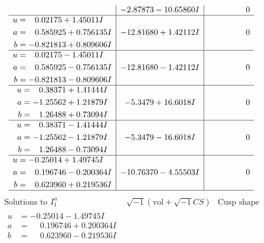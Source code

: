 \documentclass[1p]{elsarticle_modified}
\theoremstyle{definition}
\newcommand{\I}{\sqrt{-1}}
\begin{document}
$$\begin{array}{c|c|c}
 & -2.87873 - 10.65860 I & \phantom{-0.000000 } 0 \\ \hline\begin{aligned}
u &= \phantom{-}0.02175 + 1.45011 I \\
a &= \phantom{-}0.585925 + 0.756135 I \\
b &= -0.821813 + 0.809606 I\end{aligned}
 & -12.81680 + 1.42112 I & \phantom{-0.000000 } 0 \\ \hline\begin{aligned}
u &= \phantom{-}0.02175 - 1.45011 I \\
a &= \phantom{-}0.585925 - 0.756135 I \\
b &= -0.821813 - 0.809606 I\end{aligned}
 & -12.81680 - 1.42112 I & \phantom{-0.000000 } 0 \\ \hline\begin{aligned}
u &= \phantom{-}0.38371 + 1.41444 I \\
a &= -1.25562 + 1.21879 I \\
b &= \phantom{-}1.26488 + 0.73094 I\end{aligned}
 & -5.3479 + 16.6018 I & \phantom{-0.000000 } 0 \\ \hline\begin{aligned}
u &= \phantom{-}0.38371 - 1.41444 I \\
a &= -1.25562 - 1.21879 I \\
b &= \phantom{-}1.26488 - 0.73094 I\end{aligned}
 & -5.3479 - 16.6018 I & \phantom{-0.000000 } 0 \\ \hline\begin{aligned}
u &= -0.25014 + 1.49745 I \\
a &= \phantom{-}0.196746 - 0.200364 I \\
b &= \phantom{-}0.623960 + 0.219536 I\end{aligned}
 & -10.76370 - 4.55503 I & \phantom{-0.000000 } 0\\
 \hline 
 \end{array}$$\newpage$$\begin{array}{c|c|c}  
\text{Solutions to }I^u_{1}& \I (\text{vol} + \sqrt{-1}CS) & \text{Cusp shape}\\
 \hline 
\begin{aligned}
u &= -0.25014 - 1.49745 I \\
a &= \phantom{-}0.196746 + 0.200364 I \\
b &= \phantom{-}0.623960 - 0.219536 I\end{aligned}

\end{array}$$
\end{document}
